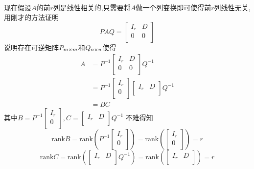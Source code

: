 \documentclass{article}
\newenvironment{cproof}{%
\heiti{证明}\kaishu
}{%
}
\newcommand{\parameter}[1]{\left(#1\right)}
\newcommand{\rank}{\text{rank}}
\begin{document}
\begin{CJK}{UTF8}{gkai}
\begin{cproof}
现在假设$A$的前$r$列是线性相关的,只需要将$A$做一个列变换即可使得前$r$列线性无关,用刚才的方法证明
\[PAQ = \begin{bmatrix}
    I_r & D\\
    0&0\\
\end{bmatrix}\]
说明存在可逆矩阵$P_{m\times m}$和$Q_{n\times n}$使得
\[
\begin{aligned}
    A &= P^{-1} \begin{bmatrix}
        I_r & D\\
        0&0\\
    \end{bmatrix}
    Q^{-1}\\
    &=P^{-1}\begin{bmatrix}
        I_r \\
        0\\
    \end{bmatrix}
    \begin{bmatrix}
        I_r & D\\
    \end{bmatrix}Q^{-1}\\
     &= BC
\end{aligned}    
\]
其中$B = P^{-1} 
\begin{bmatrix}
    I_r\\
    0\\
\end{bmatrix},C = \begin{bmatrix}
    I_r & D\\
\end{bmatrix}Q^{-1}$
不难得知
\[\rank B = \rank \parameter{P^{-1} 
\begin{bmatrix}
    I_r\\
    0\\
\end{bmatrix}}
= 
\rank \parameter{ 
\begin{bmatrix}
    I_r\\
    0\\
\end{bmatrix}}
= r\]
\[\rank C = \rank \parameter{\begin{bmatrix}
    I_r & D\\
\end{bmatrix}Q^{-1}}
=
\rank \parameter{\begin{bmatrix}
    I_r & D\\
\end{bmatrix}}
= r\]
\end{cproof}


\end{CJK}
\end{document}
